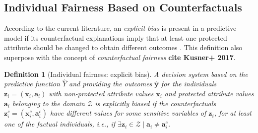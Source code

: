 \documentclass[letterpaper]{article} %
\newtheorem{definition}{Definition}
\DeclareMathOperator*{\argmin}{arg\,min}
\begin{document}

%
%


\subsection{Individual Fairness Based on Counterfactuals}


According to the current literature, an \emph{explicit bias} is present in a predictive model if its counterfactual explanations imply that at least one protected attribute should be changed to obtain different outcomes \cite{sokol2022fat}. This definition also superpose with the concept of \emph{counterfactual fairness} \textbf{cite Kusner+ 2017}.

\begin{definition}[Individual fairness: explicit bias]\label{explicit_bias}
	A decision system based on the predictive function $\hat{Y}$ and providing the outcomes $\boldsymbol{\hat{y}}$ for the individuals $\boldsymbol{z}_i = (\boldsymbol{x}_i, \boldsymbol{a}_i)$ with non-protected attribute values $\boldsymbol{x}_{i}$ and protected attribute values $\boldsymbol{a}_{i}$ belonging to the domain $\mathcal{Z}$ is \emph{explicitly biased} if the counterfactuals $\boldsymbol{z}_i^c = (\boldsymbol{x}_i^c, \boldsymbol{a}_i^c)$ have different values for some sensitive variables of $\boldsymbol{z}_i$, for at least one of the factual individuals, i.e., if $\exists \boldsymbol{z}_i \in \mathcal{Z} \mid \boldsymbol{a}_{i} \neq \boldsymbol{a}_{i}^{c}$.
\end{definition}
\end{document}
